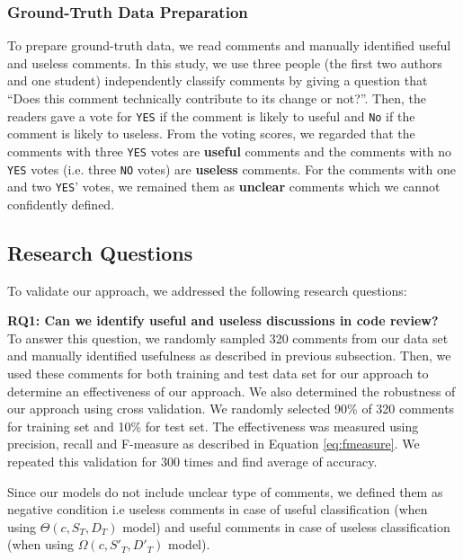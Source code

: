 \documentclass[conference]{IEEEtran}
\begin{document}
%

\subsubsection{Ground-Truth Data Preparation}
To prepare ground-truth data, we read comments and manually identified useful and useless comments. In this study, we use three people (the first two authors and one student) independently classify comments by giving a question that ``Does this comment technically contribute to its change or not?''. Then, the readers gave a vote for \texttt{YES} if the comment is likely to useful and \texttt{No} if the comment is likely to useless. From the voting scores, we regarded that the comments with three \texttt{YES} votes are \textbf{useful} comments and the comments with no \texttt{YES} votes (i.e. three \texttt{NO} votes) are \textbf{useless} comments. For the comments with one and two \texttt{YES}' votes, we remained them as \textbf{unclear} comments which we cannot confidently defined. 

\subsection{Research Questions}
To validate our approach, we addressed the following research questions:

\noindent \textbf{RQ1: Can we identify useful and useless discussions in code review?}\\
\indent To answer this question, we randomly sampled 320 comments from our data set and manually identified usefulness as described in previous subsection. Then, we used these comments for both training and test data set for our approach to determine an effectiveness of our approach. We also determined the robustness of our approach using cross validation. We randomly selected 90\% of 320 comments for training set and 10\% for test set.
The effectiveness was measured using precision, recall and F-measure as described in Equation \ref{eq:fmeasure}. We repeated this validation for 300 times and find average of accuracy.

Since our models do not include unclear type of comments, we defined them as negative condition i.e useless comments in case of useful classification (when using $\Theta(c,S_T,D_T)$ model) and useful comments in case of useless classification (when using $\Omega(c,S'_T,D'_T)$ model).
\end{document}
